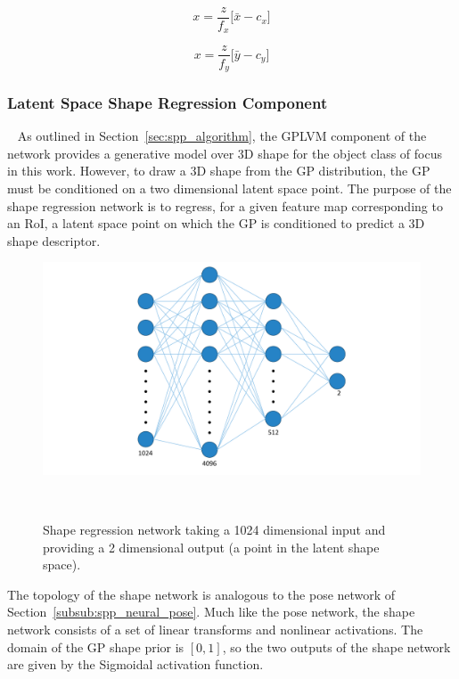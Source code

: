 \begin{equation}
  \label{eqn:spp_x_3d}
  x = \frac{z}{f_{x}} \Big[ \bar{x} - c_{x} \Big]
\end{equation}

\begin{equation}
  \label{eqn:spp_y_3d}
  x = \frac{z}{f_{y}} \Big[ \bar{y} - c_{y} \Big]
\end{equation}

\subsubsection{Latent Space Shape Regression Component}
~\label{subsub:spp_neural_latent}
As outlined in Section~\ref{sec:spp_algorithm}, the GPLVM component of the network provides 
a generative model over 3D shape for the object class of focus in this work. However, to draw 
a 3D shape from the GP distribution, the GP must be conditioned on a two dimensional latent space 
point. The purpose of the shape regression network is to regress, for a given feature map corresponding 
to an RoI, a latent space point on which the GP is conditioned to predict a 3D shape descriptor.

\begin{figure}[!htbp]
  \centering
  \includegraphics[width=.8\linewidth]{figures/spp/shape_net_diagram.pdf}
  \caption[Shape Regression Network]{Shape regression network taking a 1024 dimensional 
  input and providing a 2 dimensional output (a point in the latent shape space).}
~\label{figure:spp_shape_block}
\end{figure}

The topology of the shape network is analogous to the pose network of Section~\ref{subsub:spp_neural_pose}. 
Much like the pose network, the shape network consists of a set of linear transforms and nonlinear 
activations. The domain of the GP shape prior is \( [0, 1] \), so the two outputs of the shape network 
are given by the Sigmoidal activation function.

